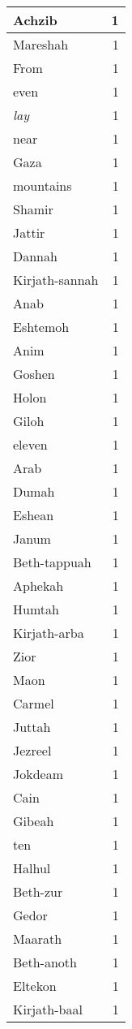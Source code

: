 \begin{center}
\begin{longtable}{l|r}
Achzib & 1\\ \hline 
Mareshah & 1\\ \hline 
From & 1\\ \hline 
even & 1\\ \hline 
\emph{lay} & 1\\ \hline 
near & 1\\ \hline 
Gaza & 1\\ \hline 
mountains & 1\\ \hline 
Shamir & 1\\ \hline 
Jattir & 1\\ \hline 
Dannah & 1\\ \hline 
Kirjath-sannah & 1\\ \hline 
Anab & 1\\ \hline 
Eshtemoh & 1\\ \hline 
Anim & 1\\ \hline 
Goshen & 1\\ \hline 
Holon & 1\\ \hline 
Giloh & 1\\ \hline 
eleven & 1\\ \hline 
Arab & 1\\ \hline 
Dumah & 1\\ \hline 
Eshean & 1\\ \hline 
Janum & 1\\ \hline 
Beth-tappuah & 1\\ \hline 
Aphekah & 1\\ \hline 
Humtah & 1\\ \hline 
Kirjath-arba & 1\\ \hline 
Zior & 1\\ \hline 
Maon & 1\\ \hline 
Carmel & 1\\ \hline 
Juttah & 1\\ \hline 
Jezreel & 1\\ \hline 
Jokdeam & 1\\ \hline 
Cain & 1\\ \hline 
Gibeah & 1\\ \hline 
ten & 1\\ \hline 
Halhul & 1\\ \hline 
Beth-zur & 1\\ \hline 
Gedor & 1\\ \hline 
Maarath & 1\\ \hline 
Beth-anoth & 1\\ \hline 
Eltekon & 1\\ \hline 
Kirjath-baal & 1\\ \hline 

\end{longtable}
\end{center}
